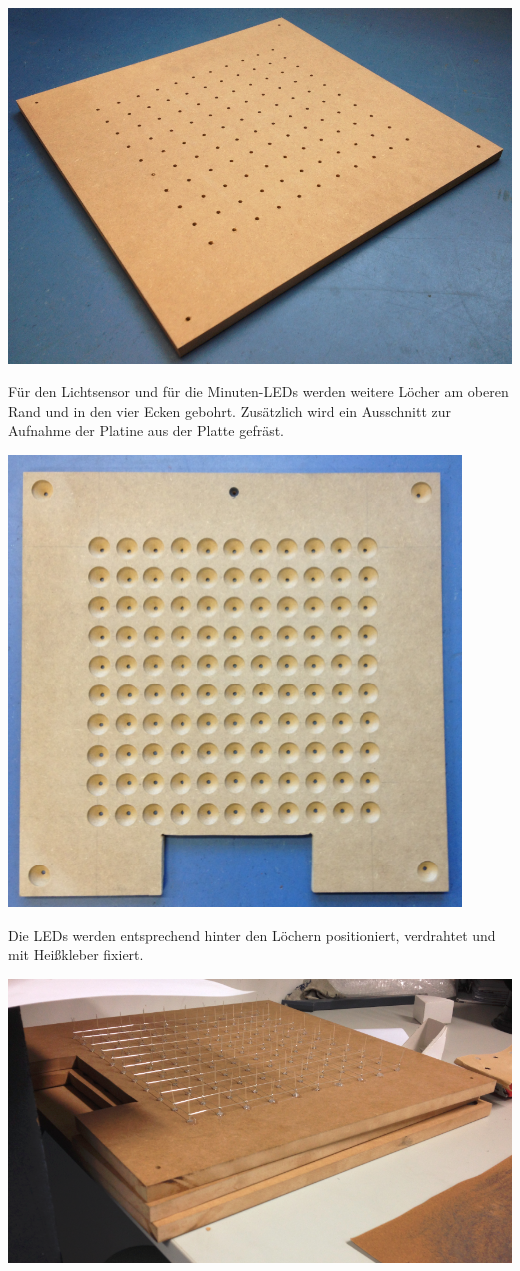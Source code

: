 \begin{multicols}{2}
{
\centering\includegraphics[width=0.8\columnwidth]{Abbildungen/Konstruktion/Platte02}

}
Für den Lichtsensor und für die Minuten-LEDs werden weitere Löcher am oberen Rand und in den vier Ecken gebohrt. Zusätzlich wird ein Ausschnitt zur Aufnahme der Platine aus der Platte gefräst. 

{
\centering\includegraphics[width=0.85\columnwidth]{Abbildungen/Konstruktion/Platte03}

}
Die LEDs werden entsprechend hinter den Löchern positioniert, verdrahtet und mit Heißkleber fixiert. 

{
\centering\includegraphics[width=0.85\columnwidth]{Abbildungen/Konstruktion/LED01}

}
\end{multicols}

